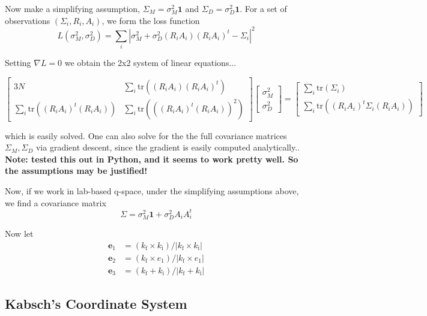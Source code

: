 \documentclass[11pt,a4paper]{article}
\def\v#1{\bm{{#1}}}
\def\si{\text{i}}
\def\sf{\text{f}}
\def\be{{\v{e}}}
\def\tr{\mathrm{tr}}
\begin{document}
Now make a simplifying assumption, $\Sigma_M = \sigma_M^2 \v1$ and $\Sigma_D = \sigma_D^2 \v1$. For a set of observations $(\Sigma_i, R_i, A_i)$, we form the loss function
\begin{equation}
  L(\sigma_M^2, \sigma_D^2)
  = \sum_i |\sigma_M^2 + \sigma_D^2 (R_i A_i)(R_iA_i)^t - \Sigma_i|^2
\end{equation}

Setting $\nabla L = 0$ we obtain the 2x2 system of linear equations...

\begin{equation}
  \begin{bmatrix}
    3N & \sum_i \tr( (R_iA_i)(R_i A_i)^t) \\
    \sum_i \tr((R_iA_i)^t(R_i A_i)) & \sum_i \tr(((R_i A_i)^t(R_iA_i))^2)
  \end{bmatrix}
  \begin{bmatrix}
    \sigma_M^2 \\
    \sigma_D^2
  \end{bmatrix}
  =
  \begin{bmatrix}
    \sum_i \tr(\Sigma_i) \\
    \sum_i \tr((R_i A_i)^t \Sigma_i (R_i A_i))
  \end{bmatrix}
\end{equation}

which is easily solved. One can also solve for the the full covariance matrices $\Sigma_M, \Sigma_D$ via gradient descent, since the gradient is easily computed analytically.. \textbf{Note: tested this out in Python, and it seems to work pretty well. So the assumptions may be justified!}

Now, if we work in lab-based q-space, under the simplifying assumptions above, we find a covariance matrix
\begin{equation} \Sigma = \sigma_M^2 \v1 + \sigma_D^2 A_i A_i^t \end{equation}

Now let
\begin{align}
  \be_1 &= (k_\sf \times k_\si) / |k_\sf \times k_\si| \\
  \be_2 &= (k_\sf \times e_1) / |k_\sf \times e_1| \\
  \be_3 &= (k_\sf + k_\si) / |k_\sf + k_\si|
\end{align}


\subsection{Kabsch's Coordinate System}
\end{document}
